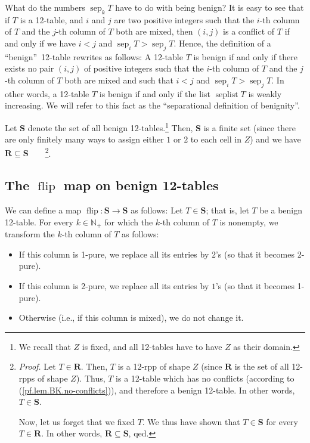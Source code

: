 \documentclass[numbers=enddot,12pt,final,onecolumn,notitlepage]{scrartcl}%
\theoremstyle{definition}
\begin{document}
What do the numbers $\operatorname*{sep}\nolimits_{k}T$ have to do with being
benign? It is easy to see that if $T$ is a 12-table, and $i$ and $j$ are two
positive integers such that the $i$-th column of $T$ and the $j$-th column of
$T$ both are mixed, then $\left(  i,j\right)  $ is a conflict of $T$ if and
only if we have $i<j$ and $\operatorname*{sep}\nolimits_{i}%
T>\operatorname*{sep}\nolimits_{j}T$. Hence, the definition of a
\textquotedblleft benign\textquotedblright\ 12-table rewrites as follows: A
12-table $T$ is benign if and only if there exists no pair $\left(
i,j\right)  $ of positive integers such that the $i$-th column of $T$ and the
$j$-th column of $T$ both are mixed and such that $i<j$ and
$\operatorname*{sep}\nolimits_{i}T>\operatorname*{sep}\nolimits_{j}T$. In
other words, a 12-table $T$ is benign if and only if the list
$\operatorname*{seplist}T$ is weakly increasing. We will refer to this fact as
the \textquotedblleft separational definition of benignity\textquotedblright.

Let $\mathbf{S}$ denote the set of all benign 12-tables.\footnote{We recall
that $Z$ is fixed, and all 12-tables have to have $Z$ as their domain.} Then,
$\mathbf{S}$ is a finite set (since there are only finitely many ways to
assign either $1$ or $2$ to each cell in $Z$) and we have $\mathbf{R}%
\subseteq\mathbf{S}$\ \ \ \ \footnote{\textit{Proof.} Let $T\in\mathbf{R}$.
Then, $T$ is a 12-rpp of shape $Z$ (since $\mathbf{R}$ is the set of all
12-rpps of shape $Z$). Thus, $T$ is a 12-table which has no conflicts
(according to (\ref{pf.lem.BK.no-conflicts})), and therefore a benign
12-table. In other words, $T\in\mathbf{S}$.
\par
Now, let us forget that we fixed $T$. We thus have shown that $T\in\mathbf{S}$
for every $T\in\mathbf{R}$. In other words, $\mathbf{R}\subseteq\mathbf{S}$,
qed.}.

\subsection{The $\operatorname*{flip}$ map on benign 12-tables}

We can define a map $\operatorname*{flip}:\mathbf{S}\rightarrow\mathbf{S}$ as
follows: Let $T\in\mathbf{S}$; that is, let $T$ be a benign 12-table. For
every $k\in\mathbb{N}_{+}$ for which the $k$-th column of $T$ is nonempty, we
transform the $k$-th column of $T$ as follows:

\begin{itemize}
\item If this column is 1-pure, we replace all its entries by $2$'s (so that
it becomes 2-pure).

\item If this column is 2-pure, we replace all its entries by $1$'s (so that
it becomes 1-pure).

\item Otherwise (i.e., if this column is mixed), we do not change it.
\end{itemize}
\end{document}
